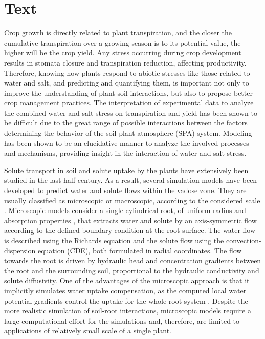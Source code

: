 \section*{Text}

Crop growth is directly related to plant transpiration, and the closer the cumulative transpiration over a growing season is to its potential value, the higher will be the crop yield. 
Any stress occurring during crop development results in stomata closure and transpiration reduction, affecting productivity. 
Therefore, knowing how plants respond to abiotic stresses like those related to water and salt, and predicting and quantifying them, is important not only to improve the understanding of plant-soil interactions, but also to propose better crop management practices.
The interpretation of experimental data to analyze the combined water and salt stress on transpiration and yield has been shown to be difficult due to the great range of possible interactions between the factors determining the behavior of the soil-plant-atmosphere (SPA) system.
Modeling has been shown to be an elucidative manner to analyze the involved processes and mechanisms, providing insight in the interaction of water and salt stress.

Solute transport in soil and solute uptake by the plants have extensively been studied in the last half century.
As a result, several simulation models have been developed to predict water and solute flows within the vadose zone. 
They are usually classified as microscopic or macroscopic, according to the considered scale \citep{feddes}. 
Microscopic models \citep{barber74,cushman,willigen1,roose} consider a single cylindrical root, of uniform radius and absorption properties \citep{gardner}, that extracts water and solute by an axis-symmetric flow according to the defined boundary condition at the root surface.
The water flow is described using the Richards equation and the solute flow using the convection-dispersion equation (CDE), both formulated in radial coordinates.
The flow towards the root is driven by hydraulic head and concentration gradients between the root and the surrounding soil, proportional to the hydraulic conductivity and solute diffusivity. 
One of the advantages of the microscopic approach is that it implicitly simulates water uptake compensation, as the computed local water potential gradients control the uptake for the whole root system \citep{simunek}. 
Despite the more realistic simulation of soil-root interactions, microscopic models require a large computational effort for the simulations and, therefore, are limited to applications of relatively small scale of a single plant.

